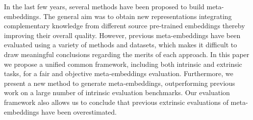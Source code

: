 In the last few years, several methods have been proposed to build meta-embeddings. The general aim was to obtain new representations integrating complementary knowledge from different source pre-trained embeddings thereby improving their overall quality. However, previous meta-embeddings have been evaluated using a variety of methods and datasets, which makes it difficult to draw meaningful conclusions regarding the merits of each approach. In this paper we propose a unified common framework, including both intrinsic and extrinsic tasks, for a fair and objective meta-embeddings evaluation. Furthermore, we present a new method to generate meta-embeddings, outperforming previous work on a large number of intrinsic evaluation benchmarks. Our evaluation framework also allows us to conclude that previous extrinsic evaluations of meta-embeddings have been overestimated.
